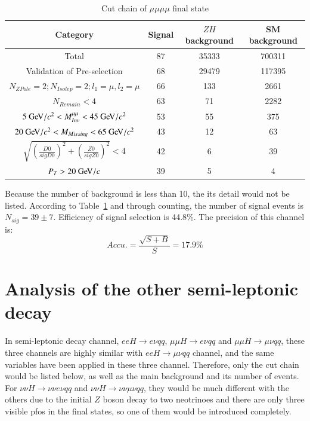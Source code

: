 \documentclass[11pt,a4paper]{cepcnote}
\begin{document}
\begin{table}[H]
  \begin{center}
    \begin{tabular}{cccc}
      \hline \hline
      \multicolumn{1}{c}{Category}&\multicolumn{1}{c}{Signal}&\multicolumn{1}{c}{$ZH$ background}&\multicolumn{1}{c}{SM background}\\ 
      \hline
      Total		       	 									&  87	& 35333	& 700311\\
	  Validation of Pre-selection							&  68	& 29479	& 117395\\
      $N_{ZPole}=2; N_{Isolep}=2; l_1 = \mu, l_2 = \mu$		&  66	& 133	& 2661	\\
	  $N_{Remain} < 4$										&  63	& 71	& 2282	\\
	  $5\gev/c^2 < M_{Inv}^{\mu\mu} < 45\gev/c^2$		   	&  53	& 55	& 375	\\
	  $20\gev/c^2 < M_{Missing} < 65\gev/c^2$	        	&  43	& 12	& 63	\\
	  $\sqrt{(\frac{D0}{sigD0})^2+(\frac{Z0}{sigZ0})^2} < 4$&  42 	& 6		& 39	\\
	  $P_{T} > 20\gev/c$									&  39	& 5		& 4		\\
      \hline \hline
    \end{tabular}
   \caption[Monte Carlo purities in the single lepton sample]{Cut chain of $\mu\mu\mu\mu$ final state}
  \label{tab:cutchainuuuvuv}
 \end{center}
\end{table}

Because the number of background is less than 10, the its detail would not be listed.
According to Table~\ref{tab:cutchainuuuvuv} and through counting, the number of signal events is $N_{sig} = 39\pm 7$. 
Efficiency of signal selection is 44.8\%. The precision of this channel is:
\begin{equation*}
	Accu. = \frac{\sqrt{S+B}}{S} = 17.9\%
\end{equation*}

\section{Analysis of the other semi-leptonic decay}
In semi-leptonic decay channel, $eeH \to e\nu qq$, $\mu\mu H \to e\nu qq$ and $\mu\mu H \to \mu\nu qq$, these three channels are 
highly similar with $eeH \to \mu\nu qq$ channel, and the same variables have been applied in these three channel. 
Therefore, only the cut chain would be listed below, as well as the main background and its number of events.
For $\nu\nu H \to \nu\nu e\nu qq$ and $\nu\nu H \to \nu\nu \mu\nu qq$, they would be much different with the others
due to the initial $Z$ boson decay to two neotrinoes and there are only three visible pfos in the final states, 
so one of them would be introduced completely.
\end{document}

